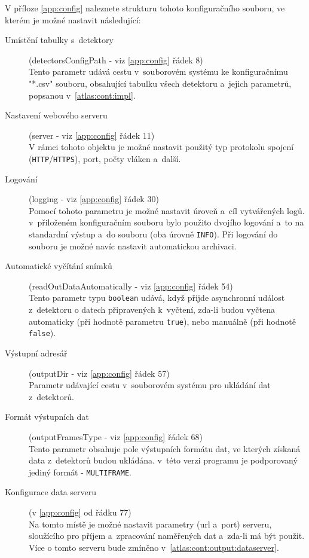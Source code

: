V příloze \ref{app:config} naleznete strukturu tohoto konfiguračního souboru, ve kterém je možné nastavit následující:
\begin{description}
	\item[Umístění tabulky s~detektory] (detectorsConfigPath - viz \ref{app:config} řádek 8)\\
		Tento parametr udává cestu v~souborovém systému ke konfiguračnímu "*.csv" souboru, obsahující tabulku všech detektoru a~jejich parametrů, popsanou v~\ref{atlas:cont:impl}.
	\item[Nastavení webového serveru] (server - viz \ref{app:config} řádek 11)\\
		V rámci tohoto objektu je možné nastavit použitý typ protokolu spojení (\texttt{HTTP}/\texttt{HTTPS}), port, počty vláken a~další.
	\item[Logování] (logging - viz \ref{app:config} řádek 30)\\
		Pomocí tohoto parametru je možné nastavit úroveň a~cíl vytvářených logů. v~přiloženém konfiguračním souboru bylo použito dvojího logování a~to na standardní výstup a~do souboru (oba úrovně \texttt{INFO}). Při logování do souboru je možné navíc nastavit automatickou archivaci.
	\item[Automatické vyčítání snímků] (readOutDataAutomatically - viz \ref{app:config} řádek 54)\\
		Tento parametr typu \texttt{boolean} udává, když přijde asynchronní událost z~detektoru o datech připravených k~vyčtení, zda-li budou vyčtena automaticky (při hodnotě parametru \texttt{true}), nebo manuálně (při hodnotě \texttt{false}).
	\item[Výstupní adresář] (outputDir - viz \ref{app:config} řádek 57)\\
		Parametr udávající cestu v~souborovém systému pro ukládání dat z~detektorů.
	\item[Formát výstupních dat] (outputFramesType - viz \ref{app:config} řádek 68)\\
		Tento parametr obsahuje pole výstupních formátu dat, ve kterých získaná data z~detektorů budou ukládána. v~této verzi programu je podporovaný jediný formát - \texttt{MULTIFRAME}.
	\item[Konfigurace data serveru] (v \ref{app:config} od řádku 77)\\
		Na tomto místě je možné nastavit parametry (url a~port) serveru, sloužícího pro příjem a~zpracování naměřených dat a~zda-li má být použit. Více o tomto serveru bude zmíněno v~\ref{atlas:cont:output:dataserver}.
\end{description}

